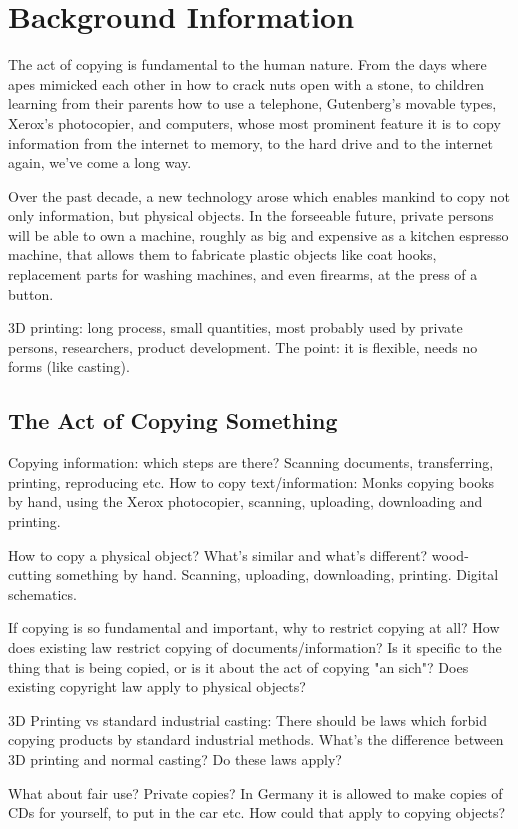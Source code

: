 \section{Background Information}

The act of copying is fundamental to the human nature.  From the days where apes
mimicked each other in how to crack nuts open with a stone, to children
learning from their parents how to use a telephone, Gutenberg's movable types,
Xerox's photocopier, and computers, whose most prominent feature it is to copy
information from the internet to memory, to the hard drive and to the internet
again, we've come a long way.

Over the past decade, a new technology arose which enables mankind to copy not
only information, but physical objects.  In the forseeable future, private
persons will be able to own a machine, roughly as big and expensive as a
kitchen espresso machine, that allows them to fabricate plastic objects like
coat hooks, replacement parts for washing machines, and even firearms, at the
press of a button.

3D printing: long process, small quantities, most probably used by private
persons, researchers, product development.  The point: it is flexible, needs no
forms (like casting).

\subsection{The Act of Copying Something}

Copying information: which steps are there?  Scanning documents, transferring,
printing, reproducing etc.  How to copy text/information: Monks copying books
by hand, using the Xerox photocopier, scanning, uploading, downloading and
printing.

How to copy a physical object?  What's similar and what's different?
wood-cutting something by hand.  Scanning, uploading, downloading, printing.
Digital schematics.

If copying is so fundamental and important, why to restrict copying at all?
How does existing law restrict copying of documents/information?  Is it
specific to the thing that is being copied, or is it about the act of copying
"an sich"?  Does existing copyright law apply to physical objects?

3D Printing vs standard industrial casting: There should be laws which forbid
copying products by standard industrial methods.  What's the difference between
3D printing and normal casting?  Do these laws apply?

What about fair use?  Private copies?  In Germany it is allowed to make copies
of CDs for yourself, to put in the car etc.  How could that apply to copying
objects?
